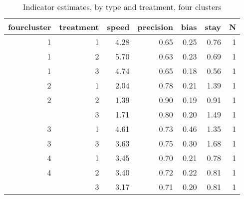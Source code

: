 \begin{table}

\caption{\label{tab:}Indicator estimates, by type and treatment, four clusters}
\centering
\begin{tabular}[t]{rrrrrrr}
\toprule
fourcluster & treatment & speed & precision & bias & stay & N\\
\midrule
1 & 1 & 4.28 & 0.65 & 0.25 & 0.76 & 1\\
1 & 2 & 5.70 & 0.63 & 0.23 & 0.69 & 1\\
1 & 3 & 4.74 & 0.65 & 0.18 & 0.56 & 1\\
2 & 1 & 2.04 & 0.78 & 0.21 & 1.39 & 1\\
2 & 2 & 1.39 & 0.90 & 0.19 & 0.91 & 1\\
\addlinespace
2 & 3 & 1.71 & 0.80 & 0.20 & 1.49 & 1\\
3 & 1 & 4.61 & 0.73 & 0.46 & 1.35 & 1\\
3 & 3 & 3.63 & 0.75 & 0.30 & 1.68 & 1\\
4 & 1 & 3.45 & 0.70 & 0.21 & 0.78 & 1\\
4 & 2 & 3.40 & 0.72 & 0.22 & 0.81 & 1\\
\addlinespace
4 & 3 & 3.17 & 0.71 & 0.20 & 0.81 & 1\\
\bottomrule
\end{tabular}
\end{table}
